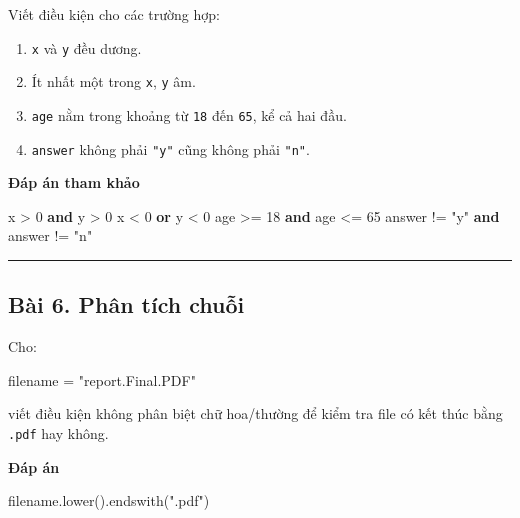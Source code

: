 \documentclass[
  11pt,
  a4paper,
]{article}
\newenvironment{Shaded}{}{}
\newcommand{\DecValTok}[1]{\textcolor[rgb]{0.25,0.63,0.44}{#1}}
\newcommand{\KeywordTok}[1]{\textcolor[rgb]{0.00,0.44,0.13}{\textbf{#1}}}
\newcommand{\NormalTok}[1]{#1}
\newcommand{\OperatorTok}[1]{\textcolor[rgb]{0.40,0.40,0.40}{#1}}
\newcommand{\StringTok}[1]{\textcolor[rgb]{0.25,0.44,0.63}{#1}}
\providecommand{\tightlist}{%
  \setlength{\itemsep}{0pt}\setlength{\parskip}{0pt}}
\begin{document}
Viết điều kiện cho các trường hợp:

\begin{enumerate}
\def\labelenumi{\arabic{enumi}.}
\tightlist
\item
  \texttt{x} và \texttt{y} đều dương.
\item
  Ít nhất một trong \texttt{x}, \texttt{y} âm.
\item
  \texttt{age} nằm trong khoảng từ \texttt{18} đến \texttt{65}, kể cả
  hai đầu.
\item
  \texttt{answer} không phải \texttt{"y"} cũng không phải \texttt{"n"}.
\end{enumerate}

\textbf{Đáp án tham khảo}

\begin{Shaded}
\begin{Highlighting}[]
\NormalTok{x }\OperatorTok{\textgreater{}} \DecValTok{0} \KeywordTok{and}\NormalTok{ y }\OperatorTok{\textgreater{}} \DecValTok{0}
\NormalTok{x }\OperatorTok{\textless{}} \DecValTok{0} \KeywordTok{or}\NormalTok{ y }\OperatorTok{\textless{}} \DecValTok{0}
\NormalTok{age }\OperatorTok{\textgreater{}=} \DecValTok{18} \KeywordTok{and}\NormalTok{ age }\OperatorTok{\textless{}=} \DecValTok{65}
\NormalTok{answer }\OperatorTok{!=} \StringTok{"y"} \KeywordTok{and}\NormalTok{ answer }\OperatorTok{!=} \StringTok{"n"}
\end{Highlighting}
\end{Shaded}

\begin{center}\rule{0.5\linewidth}{0.5pt}\end{center}

\subsection{Bài 6. Phân tích
chuỗi}\label{buxe0i-6.-phuxe2n-tuxedch-chuux1ed7i}

Cho:

\begin{Shaded}
\begin{Highlighting}[]
\NormalTok{filename }\OperatorTok{=} \StringTok{"report.Final.PDF"}
\end{Highlighting}
\end{Shaded}

viết điều kiện không phân biệt chữ hoa/thường để kiểm tra file có kết
thúc bằng \texttt{.pdf} hay không.

\textbf{Đáp án}

\begin{Shaded}
\begin{Highlighting}[]
\NormalTok{filename.lower().endswith(}\StringTok{".pdf"}\NormalTok{)}
\end{Highlighting}
\end{Shaded}
\end{document}
